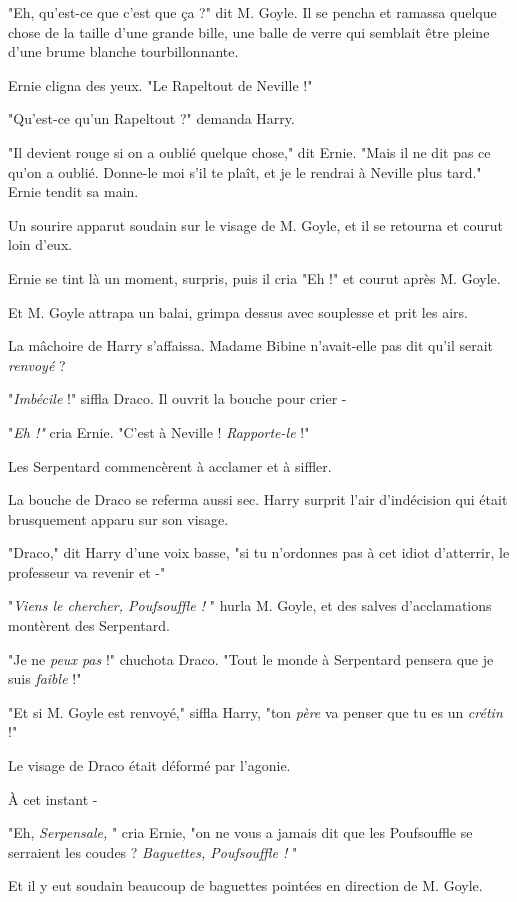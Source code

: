 "Eh, qu'est-ce que c'est que ça ?" dit M. Goyle. Il se pencha et ramassa quelque chose de la taille d'une grande bille, une balle de verre qui semblait être pleine d'une brume blanche tourbillonnante.

Ernie cligna des yeux. "Le Rapeltout de Neville !"

"Qu'est-ce qu'un Rapeltout ?" demanda Harry.

"Il devient rouge si on a oublié quelque chose," dit Ernie. "Mais il ne dit pas ce qu'on a oublié. Donne-le moi s'il te plaît, et je le rendrai à Neville plus tard." Ernie tendit sa main.

Un sourire apparut soudain sur le visage de M. Goyle, et il se retourna et courut loin d'eux.

Ernie se tint là un moment, surpris, puis il cria "Eh !" et courut après M. Goyle.

Et M. Goyle attrapa un balai, grimpa dessus avec souplesse et prit les airs.

La mâchoire de Harry s'affaissa. Madame Bibine n'avait-elle pas dit qu'il serait \emph{renvoyé}  ?

"\emph{Imbécile}  !" siffla Draco. Il ouvrit la bouche pour crier -

"\emph{Eh !"}  cria Ernie. "C'est à Neville ! \emph{Rapporte-le } !"

Les Serpentard commencèrent à acclamer et à siffler.

La bouche de Draco se referma aussi sec. Harry surprit l'air d'indécision qui était brusquement apparu sur son visage.

"Draco," dit Harry d'une voix basse, "si tu n'ordonnes pas à cet idiot d'atterrir, le professeur va revenir et -"

"\emph{Viens le chercher, Poufsouffle !} " hurla M. Goyle, et des salves d'acclamations montèrent des Serpentard.

"Je ne\emph{ peux pas}  !" chuchota Draco. "Tout le monde à Serpentard pensera que je suis \emph{faible}  !"

"Et si M. Goyle est renvoyé," siffla Harry, "ton \emph{père}  va penser que tu es un \emph{crétin}  !"

Le visage de Draco était déformé par l'agonie.

À cet instant -

"Eh, \emph{Serpensale,} " cria Ernie, "on ne vous a jamais dit que les Poufsouffle se serraient les coudes ? \emph{Baguettes, Poufsouffle !} "

Et il y eut soudain beaucoup de baguettes pointées en direction de M. Goyle.

